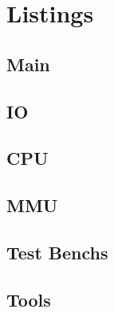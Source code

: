 \documentclass[a4paper, 12pt, titlepage, openany]{report}
\begin{document}
  \section{Listings}
    \subsection{Main}
      
    \subsection{IO}
      
      
      
      
      
    \subsection{CPU}
      
      
      
      
      
      
      
      
    \subsection{MMU}
      
      
      
      
      
      
      
      
      
    \subsection{Test Benchs}
      
      
      
      
      
      
    \subsection{Tools}
      
      
\end{document}

